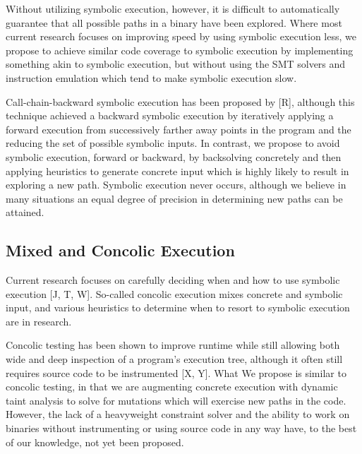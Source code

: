 \documentclass[11pt,expanded,copyright]{fsuthesis}
\begin{document}
Without utilizing symbolic execution, however, it is difficult to automatically guarantee that all possible paths in a binary have been explored. Where most current research focuses on improving speed by using symbolic execution less, we propose to achieve similar code coverage to symbolic execution by implementing something akin to symbolic execution, but without using the SMT solvers and instruction emulation which tend to make symbolic execution slow.

Call-chain-backward symbolic execution has been proposed by [R], although this technique achieved a backward symbolic execution by iteratively applying a forward execution from successively farther away points in the program and the reducing the set of possible symbolic inputs. In contrast, we propose to avoid symbolic execution, forward or backward, by backsolving concretely and then applying heuristics to generate concrete input which is highly likely to result in exploring a new path. Symbolic execution never occurs, although we believe in many situations an equal degree of precision in determining new paths can be attained.

\subsection{Mixed and Concolic Execution}



Current research focuses on carefully deciding when and how to use symbolic execution [J, T, W]. So-called concolic execution mixes concrete and symbolic input, and various heuristics to determine when to resort to symbolic execution are in research.

Concolic testing has been shown to improve runtime while still allowing both wide and deep inspection of a program's execution tree, although it often still requires source code to be instrumented [X, Y]. What We propose is similar to concolic testing, in that we are augmenting concrete execution with dynamic taint analysis to solve for mutations which will exercise new paths in the code. However, the lack of a heavyweight constraint solver and the ability to work on binaries without instrumenting or using source code in any way have, to the best of our knowledge, not yet been proposed.
\end{document}
